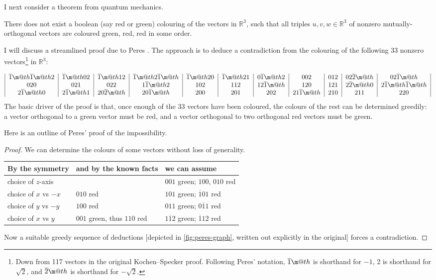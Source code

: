 \documentclass[12pt]{llncs}
\makeatletter
\newcommand*{\textoverline}[1]{$\overline{\hbox{#1}}\m@th$}
\makeatother
\begin{document}
I next consider
a theorem from quantum mechanics.
\begin{theorem}
  There does not exist a boolean (say red or green) colouring of the vectors in $\mathbb{R}^3$,
  such that all triples $u,v,w\in \mathbb{R}^3$ of nonzero mutually-orthogonal vectors
  are coloured green, red, red in some order.
\end{theorem}

I will discuss a streamlined proof due to Peres \cite{Per91}.
The approach is to deduce a contradiction from the colouring of the following 33
  nonzero vectors\footnote{
      Down from 117 vectors in the original Kochen--Specker proof.
        Following Peres' notation, \textoverline{1} is shorthand for $-1$, 2 is shorthand for $\sqrt{2}$, and \textoverline{2} is
shorthand for $-\sqrt{2}$.
  } in
$\mathbb{R}^3$:

\begin{align}
  \begin{tabular}{|c|c|c|c|c|c|c|c|c|c|c|}
  \textoverline{1}\textoverline{1}2 & \textoverline{1}02 &
  \textoverline{1}12 & \textoverline{1}2\textoverline{1} &
  \textoverline{1}20 & \textoverline{1}21 &
  0\textoverline{1}2 & 002 &
  012 & 02\textoverline{2} &
  02\textoverline{1} \\ 020 &
  021 & 022 &
  1\textoverline{1}2 & 102 &
  112 & 12\textoverline{1} &
  120 & 121 &
  2\textoverline{2}0 & 2\textoverline{1}\textoverline{1} \\
  2\textoverline{1}0 & 2\textoverline{1}1 &
  20\textoverline{2} & 20\textoverline{1} &
  200 & 201 &
  202 & 21\textoverline{1} &
  210 & 211 &
  220
\end{tabular}\label{KS-witnesses}
\end{align}
The basic driver of the proof is that,
once enough of the 33 vectors have been coloured,
the colours of the rest can be determined greedily:
a vector orthogonal to a green vector must be red,
and a vector orthogonal to two orthogonal red vectors must be green.

Here is an outline of Peres' proof \cite{Per91} of the impossibility.
\begin{proof}
  We can determine the colours of some vectors without loss of generality.
  
{\footnotesize
  \begin{tabular}{l|l|l}
  By the symmetry
  & and by the known facts
  & we can assume\\
  \hline
  choice of $z$-axis 
  && $001$ green;  $100$, $010$ red\\
  choice of $x$ vs $-x$ 
  &$010$ red
  & $101$ green; $\overline{1}01$ red\\
  choice of $y$ vs $-y$ 
  &$100$ red
  & $011$ green; $0\overline{1}1$ red\\
  choice of $x$ vs $y$ 
  &$001$ green, thus $110$ red
  & $1\overline{1}2$ green; $\overline{1}12$ red
\end{tabular}}

Now a suitable greedy sequence of deductions 
[depicted in \cref{fig:peres-graph},
written out explicitly in the original]
forces a contradiction.
\end{proof}
\end{document}
